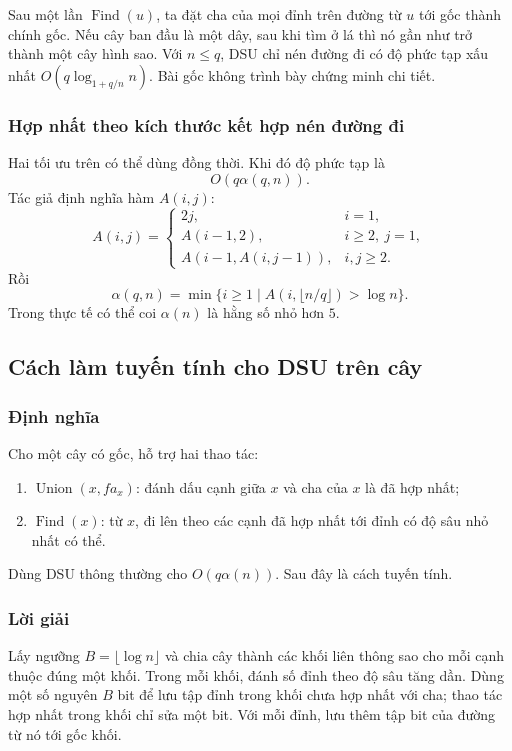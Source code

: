 \documentclass[11pt]{article}
\begin{document}
Sau một lần \(\operatorname{Find}(u)\), ta đặt cha của mọi đỉnh trên đường từ
\(u\) tới gốc thành chính gốc. Nếu cây ban đầu là một dây, sau khi tìm ở lá thì
nó gần như trở thành một cây hình sao. Với \(n\le q\), DSU chỉ nén đường đi có
độ phức tạp xấu nhất \(O(q\log_{1+q/n} n)\). Bài gốc không trình bày chứng minh
chi tiết.

\subsubsection{Hợp nhất theo kích thước kết hợp nén đường đi}

Hai tối ưu trên có thể dùng đồng thời. Khi đó độ phức tạp là
\[
  O(q\alpha(q,n)).
\]
Tác giả định nghĩa hàm \(A(i,j)\):
\[
  A(i,j)=
  \begin{cases}
    2j, & i=1,\\
    A(i-1,2), & i\ge 2,\ j=1,\\
    A(i-1,A(i,j-1)), & i,j\ge 2.
  \end{cases}
\]
Rồi
\[
  \alpha(q,n)=\min\{i\ge 1\mid A(i,\lfloor n/q\rfloor)>\log n\}.
\]
Trong thực tế có thể coi \(\alpha(n)\) là hằng số nhỏ hơn \(5\).

\subsection{Cách làm tuyến tính cho DSU trên cây}

\subsubsection{Định nghĩa}

Cho một cây có gốc, hỗ trợ hai thao tác:
\begin{enumerate}
  \item \(\operatorname{Union}(x,fa_x)\): đánh dấu cạnh giữa \(x\) và cha của
  \(x\) là đã hợp nhất;
  \item \(\operatorname{Find}(x)\): từ \(x\), đi lên theo các cạnh đã hợp nhất
  tới đỉnh có độ sâu nhỏ nhất có thể.
\end{enumerate}
Dùng DSU thông thường cho \(O(q\alpha(n))\). Sau đây là cách tuyến tính.

\subsubsection{Lời giải}

Lấy ngưỡng \(B=\lfloor\log n\rfloor\) và chia cây thành các khối liên thông sao
cho mỗi cạnh thuộc đúng một khối. Trong mỗi khối, đánh số đỉnh theo độ sâu
tăng dần. Dùng một số nguyên \(B\) bit để lưu tập đỉnh trong khối chưa hợp nhất
với cha; thao tác hợp nhất trong khối chỉ sửa một bit. Với mỗi đỉnh, lưu thêm
tập bit của đường từ nó tới gốc khối.
\end{document}
